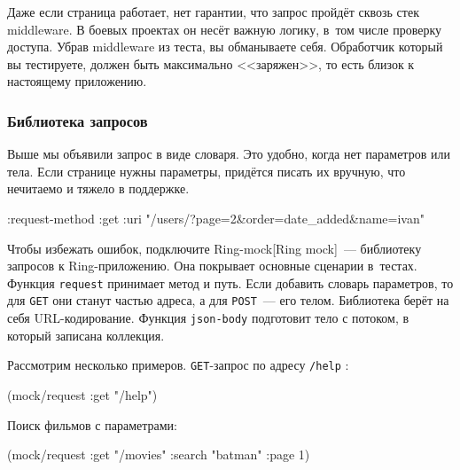 Даже если страница работает, нет гарантии, что запрос пройдёт сквозь стек
middleware. В боевых проектах он несёт важную логику, в~том числе проверку
доступа. Убрав middleware из теста, вы обманываете себя. Обработчик который вы
тестируете, должен быть максимально <<заряжен>>, то есть близок к настоящему
приложению.

\subsubsection*{Библиотека запросов}

Выше мы объявили запрос в виде словаря. Это удобно, когда нет параметров или
тела. Если странице нужны параметры, придётся писать их вручную, что нечитаемо и
тяжело в поддержке.

\begin{english}
  \begin{clojure}
{:request-method :get
 :uri "/users/?page=2&order=date_added&name=ivan"}
  \end{clojure}
\end{english}


Чтобы избежать ошибок, подключите
Ring-mock[Ring mock]~--- библиотеку
запросов к Ring-приложению. Она покрывает основные сценарии в~тестах. Функция
\verb|request| принимает метод и путь. Если добавить словарь параметров, то
для \verb|GET| они станут частью адреса, а для \verb|POST|~--- его
телом. Библиотека берёт на себя URL-кодирование. Функция \verb|json-body|
подготовит тело с потоком, в который записана коллекция.

Рассмотрим несколько примеров. \verb|GET|-запрос по адресу \verb|/help| :

\begin{english}
  \begin{clojure}
(mock/request :get "/help")
  \end{clojure}
\end{english}

\noindent
Поиск фильмов с параметрами:

\begin{english}
  \begin{clojure}
(mock/request :get "/movies" {:search "batman" :page 1})
  \end{clojure}
\end{english}


